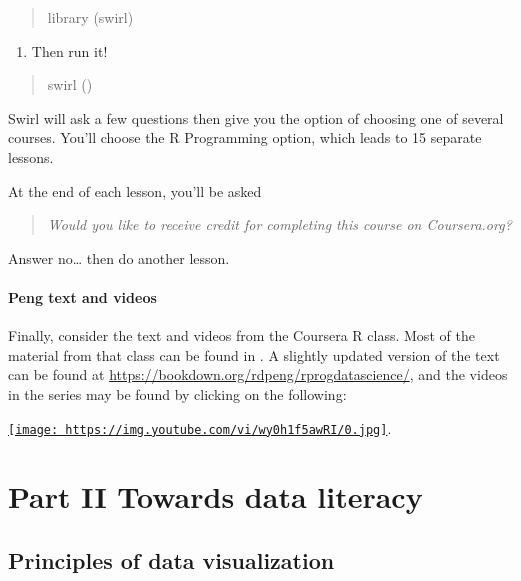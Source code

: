 \documentclass[openany]{book}
\providecommand{\tightlist}{%
  \setlength{\itemsep}{0pt}\setlength{\parskip}{0pt}}
\begin{document}
\begin{quote}
library (swirl)
\end{quote}

\begin{enumerate}
\def\labelenumi{\arabic{enumi})}
\setcounter{enumi}{1}
\tightlist
\item
  Then run it!
\end{enumerate}

\begin{quote}
swirl ()
\end{quote}

Swirl will ask a few questions then give you the option of choosing one of several courses. You'll choose the R Programming option, which leads to 15 separate lessons.

At the end of each lesson, you'll be asked

\begin{quote}
\emph{Would you like to receive credit for completing this course on Coursera.org?}
\end{quote}

Answer no\ldots{} then do another lesson.

\hypertarget{peng-text-and-videos}{%
\subsection{Peng text and videos}\label{peng-text-and-videos}}

Finally, consider the text and videos from the Coursera R class. Most of the material from that class can be found in \citet{peng2015r}. A slightly updated version of the text can be found at \url{https://bookdown.org/rdpeng/rprogdatascience/}, and the videos in the series may be found by clicking on the following:

\href{https://youtu.be/wy0h1f5awRI}{\texttt{[image: https://img.youtube.com/vi/wy0h1f5awRI/0.jpg]}}.

\hypertarget{part-part-ii-towards-data-literacy}{%
\part{Part II Towards data literacy}\label{part-part-ii-towards-data-literacy}}

\hypertarget{principles-of-data-visualization}{%
\chapter{Principles of data visualization}\label{principles-of-data-visualization}}
\end{document}
